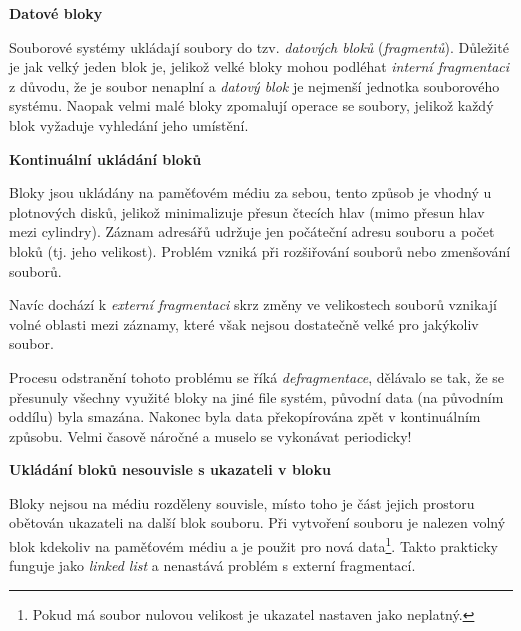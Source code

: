 \begin{Large}
    \vspace{0,5cm}
    \textbf{Datové bloky}
\end{Large}

Souborové systémy ukládají soubory do tzv. \textit{datových bloků} (\textit{fragmentů}). Důležité je jak velký jeden blok je, jelikož velké bloky mohou podléhat \textit{interní fragmentaci} z důvodu, že je soubor nenaplní a \textit{datový blok} je nejmenší jednotka souborového systému. Naopak velmi malé bloky zpomalují operace se soubory, jelikož každý blok vyžaduje vyhledání jeho umístění. 

\begin{large}
    \vspace{0,5cm}
    \textbf{Kontinuální ukládání bloků}
\end{large}

Bloky jsou ukládány na paměťovém médiu za sebou, tento způsob je vhodný u plotnových disků, jelikož minimalizuje přesun čtecích hlav (mimo přesun hlav mezi cylindry). Záznam adresářů udržuje jen počáteční adresu souboru a počet bloků (tj. jeho velikost). Problém vzniká při rozšiřování souborů nebo zmenšování souborů. 

\vspace{0,5cm}

Navíc dochází k \textit{externí fragmentaci} skrz změny ve velikostech souborů vznikají volné oblasti mezi záznamy, 
které však nejsou dostatečně velké pro jakýkoliv soubor. 

\newpage

Procesu odstranění tohoto problému se říká \textit{defragmentace}, dělávalo se tak, že se přesunuly všechny využité bloky na jiné file systém, původní data (na původním oddílu) byla smazána. Nakonec byla data překopírována zpět v kontinuálním způsobu. Velmi časově náročné a muselo se vykonávat periodicky! 

\begin{large}
    \vspace{0,5cm}
    \textbf{Ukládání bloků nesouvisle s ukazateli v bloku}
\end{large}

Bloky nejsou na médiu rozděleny souvisle, místo toho je část jejich prostoru obětován ukazateli na další blok souboru. Při vytvoření souboru je nalezen volný blok kdekoliv na paměťovém médiu a je použit pro nová data\footnote{Pokud má soubor nulovou velikost je ukazatel nastaven jako neplatný.}. Takto prakticky funguje jako \textit{linked list} a nenastává problém s externí fragmentací. 

